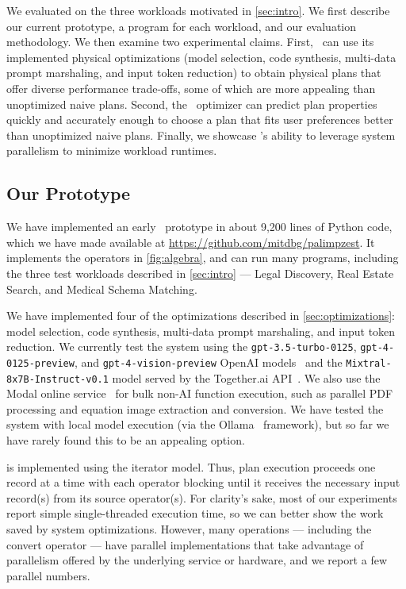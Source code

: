 
We evaluated \system{} on the three workloads motivated in \autoref{sec:intro}. We first describe our current prototype, a \system{} program for each workload, and our evaluation methodology. We then examine two experimental claims. First, \system\ can use
 its implemented physical optimizations (model selection, code synthesis, multi-data prompt marshaling, and input token reduction) to obtain physical plans that offer diverse performance trade-offs, some of which are more appealing than unoptimized naive plans. Second, the \system\ optimizer can predict plan properties quickly and accurately enough to choose a plan that fits user preferences better than unoptimized naive plans. Finally, we showcase \system{}'s ability to leverage system parallelism to minimize workload runtimes.


\subsection{Our Prototype}

We have implemented an early \system\ prototype in about 9,200 lines of Python code, which we have made available at \url{https://github.com/mitdbg/palimpzest}. It implements the operators in \autoref{fig:algebra}, and can run many programs, including the three test workloads described in \autoref{sec:intro} --- Legal Discovery, Real Estate Search, and Medical Schema Matching.

We have implemented four of the optimizations described in \autoref{sec:optimizations}: model selection, code synthesis, multi-data prompt marshaling, and input token reduction. We currently test the system using the {\tt gpt-3.5-turbo-0125}, {\tt gpt-4-0125-preview}, and {\tt gpt-4-vision-preview} OpenAI models~\cite{openaiapi} and the {\tt Mixtral-8x7B-Instruct-v0.1} model served by the Together.ai API~\cite{togetherai}. We also use the Modal online service~\cite{modalapi} for bulk non-AI function execution, such as parallel PDF processing and equation image extraction and conversion. We have tested the system with local model execution (via the Ollama~\cite{ollamawebsite} framework), but so far we have rarely found this to be an appealing option.

\system{} is implemented using the iterator model. Thus, plan execution proceeds one record at a time with each operator blocking until it receives the necessary input record(s) from its source operator(s). For clarity's sake, most of our experiments report simple single-threaded execution time, so we can better show the work saved by system optimizations.  However, many operations --- including the convert operator --- have parallel implementations that take advantage of parallelism offered by the underlying service or hardware, and we report a few parallel numbers.

